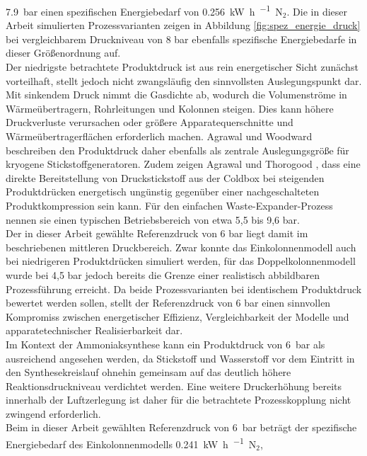 \SI{7.9}{bar} einen spezifischen Energiebedarf von
\SI{0.256}{\kilo\watt\hour\per\normalcubicmetre}~\(\mathrm{N_2}\).
Die in dieser Arbeit simulierten Prozessvarianten zeigen in Abbildung \ref{fig:spez_energie_druck} bei vergleichbarem
Druckniveau von 8 bar ebenfalls spezifische Energiebedarfe in dieser Größenordnung auf.\\
Der niedrigste betrachtete Produktdruck ist aus rein energetischer Sicht zunächst vorteilhaft, stellt jedoch nicht zwangsläufig den sinnvollsten Auslegungspunkt dar. Mit sinkendem Druck nimmt die Gasdichte ab, wodurch die Volumenströme in Wärmeübertragern, Rohrleitungen und Kolonnen steigen. Dies kann höhere Druckverluste verursachen oder größere Apparatequerschnitte und Wärmeübertragerflächen erforderlich machen. Agrawal und Woodward \cite{agrawalEfficientCryogenicNitrogen1991} beschreiben den Produktdruck daher ebenfalls als zentrale Auslegungsgröße für kryogene Stickstoffgeneratoren. Zudem zeigen Agrawal und Thorogood \cite{agrawalProductionMediumPressure1991}, dass eine direkte Bereitstellung von Druckstickstoff aus der Coldbox bei steigenden Produktdrücken energetisch ungünstig gegenüber einer nachgeschalteten Produktkompression sein kann. Für den einfachen Waste-Expander-Prozess nennen sie einen typischen Betriebsbereich von etwa 5,5 bis 9,6 bar.\\
Der in dieser Arbeit gewählte Referenzdruck von 6 bar liegt damit im beschriebenen mittleren Druckbereich. Zwar konnte das Einkolonnenmodell auch bei niedrigeren Produktdrücken simuliert werden, für das Doppelkolonnenmodell wurde bei 4,5 bar jedoch bereits die Grenze einer realistisch abbildbaren Prozessführung erreicht. Da beide Prozessvarianten bei identischem Produktdruck bewertet werden sollen, stellt der Referenzdruck von 6 bar einen sinnvollen Kompromiss zwischen energetischer Effizienz, Vergleichbarkeit der Modelle und apparatetechnischer Realisierbarkeit dar.\\
Im Kontext der Ammoniaksynthese kann ein Produktdruck von \SI{6}{bar} als ausreichend angesehen werden, da Stickstoff und Wasserstoff vor dem Eintritt in den Synthesekreislauf ohnehin gemeinsam auf das deutlich höhere Reaktionsdruckniveau verdichtet werden. Eine weitere Druckerhöhung bereits innerhalb der Luftzerlegung ist daher für die betrachtete Prozesskopplung nicht zwingend erforderlich.\\
Beim in dieser Arbeit gewählten Referenzdruck von \SI{6}{bar} beträgt der
spezifische Energiebedarf des Einkolonnenmodells
\SI{0.241}{\kilo\watt\hour\per\normalcubicmetre}~\(\mathrm{N_2}\),
